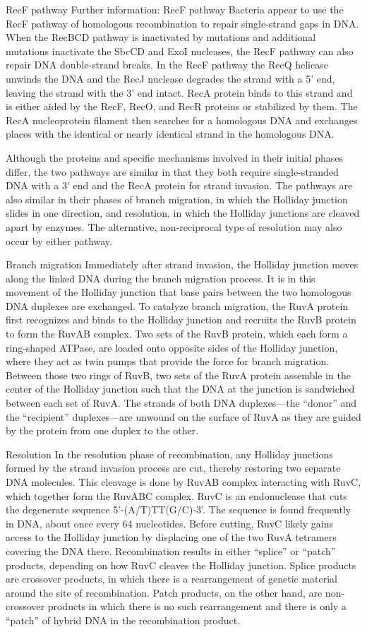 RecF pathway
Further information: RecF pathway
Bacteria appear to use the RecF pathway of homologous recombination to repair single-strand gaps in DNA. When the RecBCD pathway is inactivated by mutations and additional mutations inactivate the SbcCD and ExoI nucleases, the RecF pathway can also repair DNA double-strand breaks. In the RecF pathway the RecQ helicase unwinds the DNA and the RecJ nuclease degrades the strand with a 5' end, leaving the strand with the 3' end intact. RecA protein binds to this strand and is either aided by the RecF, RecO, and RecR proteins or stabilized by them. The RecA nucleoprotein filament then searches for a homologous DNA and exchanges places with the identical or nearly identical strand in the homologous DNA.

Although the proteins and specific mechanisms involved in their initial phases differ, the two pathways are similar in that they both require single-stranded DNA with a 3' end and the RecA protein for strand invasion. The pathways are also similar in their phases of branch migration, in which the Holliday junction slides in one direction, and resolution, in which the Holliday junctions are cleaved apart by enzymes. The alternative, non-reciprocal type of resolution may also occur by either pathway.

Branch migration
Immediately after strand invasion, the Holliday junction moves along the linked DNA during the branch migration process. It is in this movement of the Holliday junction that base pairs between the two homologous DNA duplexes are exchanged. To catalyze branch migration, the RuvA protein first recognizes and binds to the Holliday junction and recruits the RuvB protein to form the RuvAB complex. Two sets of the RuvB protein, which each form a ring-shaped ATPase, are loaded onto opposite sides of the Holliday junction, where they act as twin pumps that provide the force for branch migration. Between those two rings of RuvB, two sets of the RuvA protein assemble in the center of the Holliday junction such that the DNA at the junction is sandwiched between each set of RuvA. The strands of both DNA duplexes---the ``donor'' and the ``recipient'' duplexes---are unwound on the surface of RuvA as they are guided by the protein from one duplex to the other.

Resolution
In the resolution phase of recombination, any Holliday junctions formed by the strand invasion process are cut, thereby restoring two separate DNA molecules. This cleavage is done by RuvAB complex interacting with RuvC, which together form the RuvABC complex. RuvC is an endonuclease that cuts the degenerate sequence 5'-(A/T)TT(G/C)-3'. The sequence is found frequently in DNA, about once every 64 nucleotides. Before cutting, RuvC likely gains access to the Holliday junction by displacing one of the two RuvA tetramers covering the DNA there. Recombination results in either ``splice'' or ``patch'' products, depending on how RuvC cleaves the Holliday junction. Splice products are crossover products, in which there is a rearrangement of genetic material around the site of recombination. Patch products, on the other hand, are non-crossover products in which there is no such rearrangement and there is only a ``patch'' of hybrid DNA in the recombination product.


